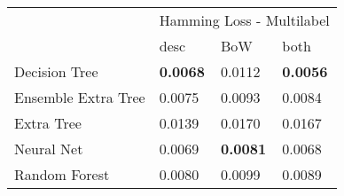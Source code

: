 \begin{tabular}{|l|l|l|l| }
\hline
 &  \multicolumn{3}{c|}{Hamming Loss - Multilabel} \\
\cline{2-4} & desc & BoW & both \\ \hline
Decision Tree       & {\bf 0.0068} & 0.0112 & {\bf 0.0056}\\
Ensemble Extra Tree & 0.0075 & 0.0093 & 0.0084\\
Extra Tree          & 0.0139 & 0.0170 & 0.0167\\
Neural Net          & 0.0069 & {\bf 0.0081} & 0.0068\\
Random Forest       & 0.0080 & 0.0099 & 0.0089\\
\hline
\end{tabular}